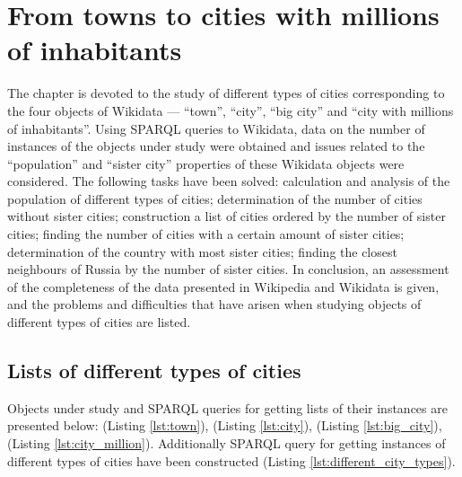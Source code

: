 \setchapterpreamble[u]{\margintoc}
\chapter{From towns to cities with millions of inhabitants\protect\footnotemark}


The chapter is devoted to the study of different types of cities corresponding to the four objects of Wikidata — ``town'', ``city'', ``big city'' and ``city with millions of inhabitants''. Using SPARQL queries to Wikidata, data on the number of instances of the objects under study were obtained and issues related to the ``population'' and ``sister city'' properties of these Wikidata objects were considered. The following tasks have been solved: calculation and analysis of the population of different types of cities; determination of the number of cities without sister cities; construction a list of cities ordered by the number of sister cities; finding the number of cities with a certain amount of sister cities; determination of the country with most sister cities; finding the closest neighbours of Russia by the number of sister cities. In conclusion, an assessment of the completeness of the data presented in Wikipedia and Wikidata is given, and the problems and difficulties that have arisen when studying objects of different types of cities are listed.

\section{Lists of different types of cities}

Objects under study and SPARQL queries for getting lists of their instances are presented below:  (Listing \ref{lst:town}),  (Listing \ref{lst:city}),  (Listing \ref{lst:big_city}),  (Listing \ref{lst:city_million}). Additionally SPARQL query for getting instances of different types of cities have been constructed (Listing \ref{lst:different_city_types}).

